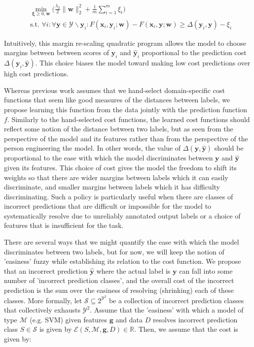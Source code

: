 \documentclass{article} %
\begin{document}
\begin{equation}
\label{marginRescaling}
\begin{split}
& \min_{\mathbf{\xi}\geq 0, \mathbf{w}}\big(\frac{\lambda_2}{2}\|\mathbf{w}\|_2^2+\frac{1}{m}\sum_{i=1}^m\xi_i\big) \\
& \text{s.t.     } \forall i : \forall \mathbf{y}\in\mathcal{Y}\backslash\mathbf{y}_i : F(\mathbf{x}_i,\mathbf{y}_i;\mathbf{w})-F(\mathbf{x}_i,\mathbf{y};\mathbf{w})\geq \Delta(\mathbf{y}_i,\mathbf{y})-\xi_i
\end{split}
\end{equation}

Intuitively, this margin re-scaling quadratic program allows 
the model to choose margins between between scores of 
$\mathbf{y}_i$ and $\mathbf{\hat{y}}_i$  proportional to
the prediction cost $\Delta(\mathbf{y}_i,\mathbf{\hat{y}})$.
This choice biases the model toward making low cost 
predictions over high cost predictions.

Whereas previous work assumes that we hand-select 
domain-specific cost functions that seem like 
good measures of the distances between labels, we
propose learning this function from the data jointly with
the prediction function $f$.  Similarly to the hand-selected
cost functions, the learned cost functions
should reflect some notion of the distance between two
labels, but as seen from the perspective of the model and its
features rather than from the perspective of the person 
engineering the model. In other words, the value of 
$\Delta(\mathbf{y}, \mathbf{\hat{y}})$ should
be proportional to the ease with which the model  
discriminates between $\mathbf{y}$ and $\mathbf{\hat{y}}$
given its features.  This choice of cost gives the model the
freedom to shift its weights so that there are wider margins
between labels which it can easily discriminate, and smaller
margins between labels which it has difficulty discriminating.
Such a policy is particularly useful when there are classes
of incorrect predictions that are difficult or impossible for 
the model to systematically resolve due to unreliably 
annotated output labels or a 
choice of features that is insufficient for the task.

There are several ways that we might quantify 
the ease with which the model discriminates between two labels,
but for now, we will keep the notion of 'easiness' fuzzy while
establishing its relation to the cost function.
We propose that an incorrect prediction 
$\mathbf{\hat{y}}$ where the actual label is $\mathbf{y}$ can 
fall into some number of 'incorrect prediction classes', and
the overall cost of the incorrect prediction is the sum over the
easiness of resolving (shrinking) each of these classes.  More
formally, let $\mathcal{S}\subseteq 2^{\mathcal{Y}^2}$ be a 
collection of incorrect prediction classes that collectively 
exhausts $\mathcal{Y}^2$.  Assume that the 'easiness' with 
which a model of type $\mathcal{M}$ (e.g. SVM) given features 
$\mathbf{g}$ and data $D$ resolves incorrect prediction 
class $S\in\mathcal{S}$ is given by 
$\mathcal{E}(S,\mathcal{M},\mathbf{g},D)\in\mathbb{R}$.
Then, we assume that the cost is given by:
\end{document}
